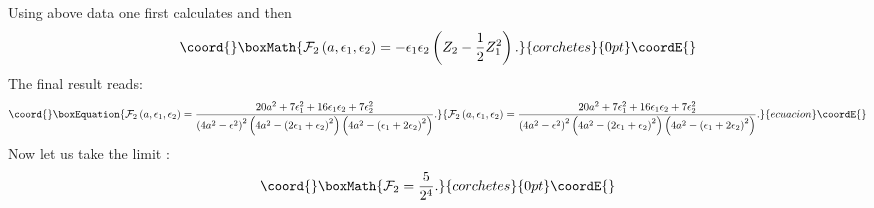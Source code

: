 \documentclass[a4paper,12pt]{article}
\begin{document}
Using above data one first calculates \coordHE{} and then
\[\coord{}\boxMath{ {\cal F}_2\left(a, \epsilon_1,\epsilon_2\right)=-\epsilon_1 \epsilon_2 \left( Z_2-\frac{1}{2} Z_1^2\right). }{corchetes}{0pt}\coordE{}\]
The final result reads:
\begin{equation}\coord{}\boxEquation{
{\cal F}_2\left(a, \epsilon_1, \epsilon_2\right)=\frac{20 a^2 + 7 \epsilon_1^2 + 16 \epsilon_1 \epsilon_2 + 7
\epsilon_2^2}{\left(4a^2 - \epsilon^2 \right)^2  \left(4a^2 - \left( 2\epsilon_1 + \epsilon_2\right)^2 \right)
 \left(4a^2 - \left(\epsilon_1 + 2\epsilon_2 \right)^2 \right)}.
}{
{\cal F}_2\left(a, \epsilon_1, \epsilon_2\right)=\frac{20 a^2 + 7 \epsilon_1^2 + 16 \epsilon_1 \epsilon_2 + 7
\epsilon_2^2}{\left(4a^2 - \epsilon^2 \right)^2  \left(4a^2 - \left( 2\epsilon_1 + \epsilon_2\right)^2 \right)
 \left(4a^2 - \left(\epsilon_1 + 2\epsilon_2 \right)^2 \right)}.
}{ecuacion}\coordE{}\end{equation}
Now let us take the limit \coordHE{}:
\[\coord{}\boxMath{
{\cal F}_2=\frac{5}{2^{4}}.
}{corchetes}{0pt}\coordE{}\]
\end{document}
